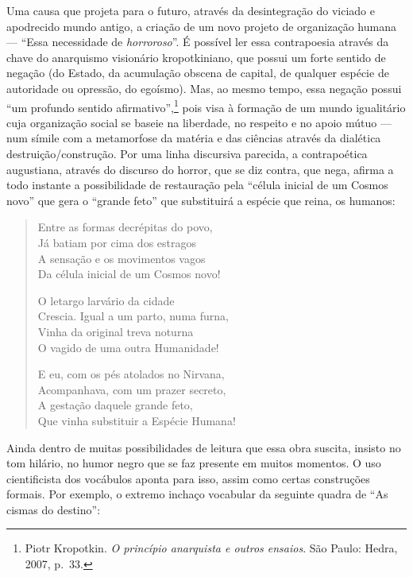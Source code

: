 Uma causa que projeta para o futuro, através da desintegração do
viciado e apodrecido mundo antigo, a criação de um novo projeto de
organização humana --- “Essa necessidade de \textit{horroroso}”. É
possível ler essa contrapoesia através da chave do anarquismo
visionário kropotkiniano, que possui um forte sentido de negação (do
Estado, da acumulação obscena de capital, de qualquer espécie de
autoridade ou opressão, do egoísmo). Mas, ao mesmo tempo, essa negação
possui “um profundo sentido afirmativo”,\footnote{Piotr Kropotkin. \textit{O princípio anarquista e outros
ensaios}. São Paulo: Hedra, 2007, p.~33.} pois
visa à formação de um mundo igualitário cuja organização social se
baseie na liberdade, no respeito e no apoio mútuo --- num símile com a
metamorfose da matéria e das ciências através da dialética
destruição/construção. Por uma linha discursiva parecida, a
contrapoética augustiana, através do discurso do horror, que se diz
contra, que nega, afirma a todo instante a possibilidade de restauração
pela “célula inicial de um Cosmos novo” que gera o “grande feto” que
substituirá a espécie que reina, os humanos: 

\begin{verse}
Entre as formas decrépitas do povo,\\
Já batiam por cima dos estragos\\
A sensação e os movimentos vagos\\
Da célula inicial de um Cosmos novo!

O letargo larvário da cidade\\
Crescia. Igual a um parto, numa furna,\\
Vinha da original treva noturna\\
O vagido de uma outra Humanidade!

E eu, com os pés atolados no Nirvana,\\
Acompanhava, com um prazer secreto,\\
A gestação daquele grande feto,\\
Que vinha substituir a Espécie Humana!
\end{verse}

\asterisc

Ainda dentro de muitas possibilidades de leitura que essa obra
suscita, insisto no tom hilário, no humor negro que se faz presente em
muitos momentos. O uso cientificista dos vocábulos aponta para isso,
assim como certas construções formais. Por exemplo, o extremo inchaço
vocabular da seguinte quadra de “As cismas do destino”:

